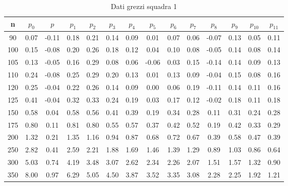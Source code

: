 \begin{table}[H]
    \centering
    \begin{tabular}{|c|c|c|c|c|c|c|c|c|c|c|c|c|c|}
    \hline
    n   & $p_0$ & $p$   & $p_1$ & $p_2$ & $p_3$ & $p_4$ & $p_5$ & $p_6$ & $p_7$ & $p_8$ & $p_9$ & $p_{10}$ & $p_{11}$ \\ \hline
    90  & 0.07    & -0.11 & 0.18  & 0.21  & 0.14  & 0.09  & 0.01  & 0.07  & 0.06  & -0.07 & 0.13  & 0.05     & 0.11     \\ \hline
    100 & 0.15    & -0.08 & 0.20  & 0.26  & 0.18  & 0.12  & 0.04  & 0.10  & 0.08  & -0.05 & 0.14  & 0.08     & 0.14     \\ \hline
    105 & 0.13    & -0.05 & 0.16  & 0.29  & 0.08  & 0.06  & -0.06 & 0.03  & 0.15  & -0.14 & 0.14  & 0.09     & 0.13     \\ \hline
    110 & 0.24    & -0.08 & 0.25  & 0.29  & 0.20  & 0.13  & 0.01  & 0.13  & 0.09  & -0.04 & 0.15  & 0.08     & 0.16     \\ \hline
    120 & 0.25    & -0.04 & 0.22  & 0.26  & 0.14  & 0.09  & 0.00  & 0.06  & 0.19  & -0.11 & 0.14  & 0.11     & 0.16     \\ \hline
    125 & 0.41    & -0.04 & 0.32  & 0.33  & 0.24  & 0.19  & 0.03  & 0.17  & 0.12  & -0.02 & 0.18  & 0.11     & 0.18     \\ \hline
    150 & 0.58    & 0.04  & 0.58  & 0.56  & 0.41  & 0.39  & 0.19  & 0.34  & 0.28  & 0.11  & 0.31  & 0.24     & 0.28     \\ \hline
    175 & 0.80    & 0.11  & 0.81  & 0.80  & 0.55  & 0.57  & 0.37  & 0.42  & 0.52  & 0.19  & 0.42  & 0.33     & 0.29     \\ \hline
    200 & 1.32    & 0.21  & 1.35  & 1.16  & 0.94  & 0.87  & 0.68  & 0.72  & 0.67  & 0.39  & 0.58  & 0.47     & 0.39     \\ \hline
    250 & 2.82    & 0.41  & 2.59  & 2.21  & 1.88  & 1.69  & 1.46  & 1.39  & 1.29  & 0.89  & 1.03  & 0.86     & 0.64     \\ \hline
    300 & 5.03    & 0.74  & 4.19  & 3.48  & 3.07  & 2.62  & 2.34  & 2.26  & 2.07  & 1.51  & 1.57  & 1.32     & 0.90     \\ \hline
    350 & 8.00    & 0.97  & 6.29  & 5.05  & 4.50  & 3.87  & 3.52  & 3.35  & 3.08  & 2.28  & 2.25  & 1.92     & 1.21     \\ \hline
    \end{tabular}
    \caption{Dati grezzi squadra 1}
\end{table}

